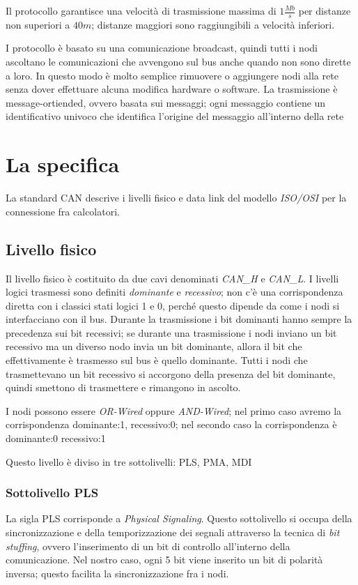 \documentclass[a4paper,10pt]{book}
\begin{document}
Il protocollo garantisce una velocità di trasmissione massima di
$1\frac{Mb}{s}$ per distanze non superiori a $40m$; distanze
maggiori sono raggiungibili a velocità inferiori.
\newline

I protocollo è basato su una comunicazione broadcast, quindi tutti i
nodi ascoltano le comunicazioni che avvengono sul bus anche quando
non sono dirette a loro. In questo modo è molto semplice rimuovere o
aggiungere nodi alla rete senza dover effettuare alcuna modifica
hardware o software. La trasmissione è message-ortiended, ovvero
basata sui messaggi; ogni messaggio contiene un identificativo
univoco che identifica l'origine del messaggio all'interno della rete

\chapter{La specifica}
La standard CAN descrive i livelli fisico e data link del modello
\textit{ISO/OSI} per la connessione fra calcolatori.
\section{Livello fisico}
Il livello fisico è costituito da due cavi denominati \textit{CAN\_H}
e \textit{CAN\_L}. I livelli logici trasmessi sono definiti
\textit{dominante} e \textit{recessivo}; non c'è una corrispondenza
diretta con i classici stati logici 1 e 0, perché questo dipende da
come i nodi si interfacciano con il bus. Durante la trasmissione i
bit dominanti hanno sempre la precedenza sui bit recessivi; se
durante una trasmissione i nodi inviano un bit recessivo ma un
diverso nodo invia un bit dominante, allora il bit che effettivamente
è trasmesso sul bus è quello dominante. Tutti i nodi che
trasmettevano un bit recessivo si accorgono della presenza del bit
dominante, quindi smettono di trasmettere e rimangono in ascolto.

I nodi possono essere \textit{OR-Wired} oppure \textit{AND-Wired};
nel primo caso avremo la corrispondenza dominante:1, recessivo:0; nel
secondo caso la corrispondenza è dominante:0 recessivo:1


Questo livello è diviso in tre sottolivelli: PLS, PMA, MDI
\subsection{Sottolivello PLS}
La sigla PLS corrisponde a \textit{Physical Signaling}. Questo
sottolivello si occupa della sincronizzazione e della temporizzazione
dei segnali attraverso la tecnica di \textit{bit stuffing}, ovvero
l'inserimento di un bit di controllo all'interno della comunicazione.
Nel nostro caso, ogni 5 bit viene inserito un bit di polarità
inversa; questo facilita la sincronizzazione fra i nodi.
\newline
\end{document}

